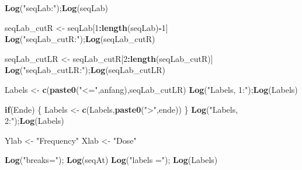 \documentclass[
]{article}
\newenvironment{Shaded}{\begin{snugshade}}{\end{snugshade}}
\newcommand{\ControlFlowTok}[1]{\textcolor[rgb]{0.13,0.29,0.53}{\textbf{#1}}}
\newcommand{\DecValTok}[1]{\textcolor[rgb]{0.00,0.00,0.81}{#1}}
\newcommand{\KeywordTok}[1]{\textcolor[rgb]{0.13,0.29,0.53}{\textbf{#1}}}
\newcommand{\NormalTok}[1]{#1}
\newcommand{\OperatorTok}[1]{\textcolor[rgb]{0.81,0.36,0.00}{\textbf{#1}}}
\newcommand{\StringTok}[1]{\textcolor[rgb]{0.31,0.60,0.02}{#1}}
\begin{document}
\begin{Shaded}
\begin{Highlighting}[]
{{{  \KeywordTok{Log}\NormalTok{(}\StringTok{"seqLab:"}\NormalTok{);}\KeywordTok{Log}\NormalTok{(seqLab)}
    
\NormalTok{  seqLab_cutR <-}\StringTok{ }\NormalTok{seqLab[}\DecValTok{1}\OperatorTok{:}\KeywordTok{length}\NormalTok{(seqLab)}\OperatorTok{-}\DecValTok{1}\NormalTok{]           }
  \KeywordTok{Log}\NormalTok{(}\StringTok{"seqLab_cutR:"}\NormalTok{);}\KeywordTok{Log}\NormalTok{(seqLab_cutR)}
    
\NormalTok{  seqLab_cutLR <-}\StringTok{ }\NormalTok{seqLab_cutR[}\DecValTok{2}\OperatorTok{:}\KeywordTok{length}\NormalTok{(seqLab_cutR)]  }
  \KeywordTok{Log}\NormalTok{(}\StringTok{"seqLab_cutLR:"}\NormalTok{);}\KeywordTok{Log}\NormalTok{(seqLab_cutLR)}
    
\NormalTok{  Labels <-}\StringTok{ }\KeywordTok{c}\NormalTok{(}\KeywordTok{paste0}\NormalTok{(}\StringTok{"<="}\NormalTok{,anfang),seqLab_cutLR)}
  \KeywordTok{Log}\NormalTok{(}\StringTok{"Labels, 1:"}\NormalTok{);}\KeywordTok{Log}\NormalTok{(Labels)}
    
  \ControlFlowTok{if}\NormalTok{(Ende) \{ Labels <-}\StringTok{ }\KeywordTok{c}\NormalTok{(Labels,}\KeywordTok{paste0}\NormalTok{(}\StringTok{">"}\NormalTok{,ende)) \}}
  \KeywordTok{Log}\NormalTok{(}\StringTok{"Labels, 2:"}\NormalTok{);}\KeywordTok{Log}\NormalTok{(Labels)}

\NormalTok{  Ylab <-}\StringTok{ "Frequency"}
\NormalTok{  Xlab <-}\StringTok{ "Dose"}

  \KeywordTok{Log}\NormalTok{(}\StringTok{"breaks="}\NormalTok{); }\KeywordTok{Log}\NormalTok{(seqAt)}
  \KeywordTok{Log}\NormalTok{(}\StringTok{"labels ="}\NormalTok{); }\KeywordTok{Log}\NormalTok{(Labels)}
    
}}}
\end{Highlighting}
\end{Shaded}
\end{document}
